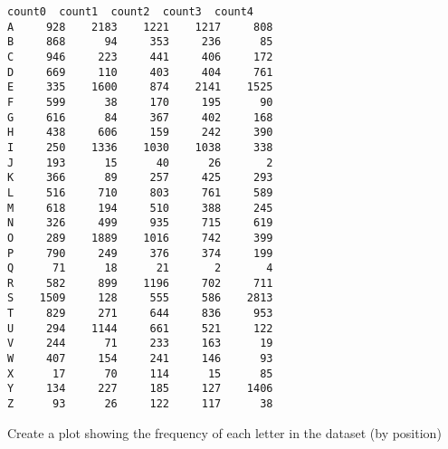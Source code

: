 \documentclass[11pt]{article}
\begin{document}
    \begin{Verbatim}[commandchars=\\\{\}]
   count0  count1  count2  count3  count4
A     928    2183    1221    1217     808
B     868      94     353     236      85
C     946     223     441     406     172
D     669     110     403     404     761
E     335    1600     874    2141    1525
F     599      38     170     195      90
G     616      84     367     402     168
H     438     606     159     242     390
I     250    1336    1030    1038     338
J     193      15      40      26       2
K     366      89     257     425     293
L     516     710     803     761     589
M     618     194     510     388     245
N     326     499     935     715     619
O     289    1889    1016     742     399
P     790     249     376     374     199
Q      71      18      21       2       4
R     582     899    1196     702     711
S    1509     128     555     586    2813
T     829     271     644     836     953
U     294    1144     661     521     122
V     244      71     233     163      19
W     407     154     241     146      93
X      17      70     114      15      85
Y     134     227     185     127    1406
Z      93      26     122     117      38
    \end{Verbatim}

    Create a plot showing the frequency of each letter in the dataset (by
position)
\end{document}
